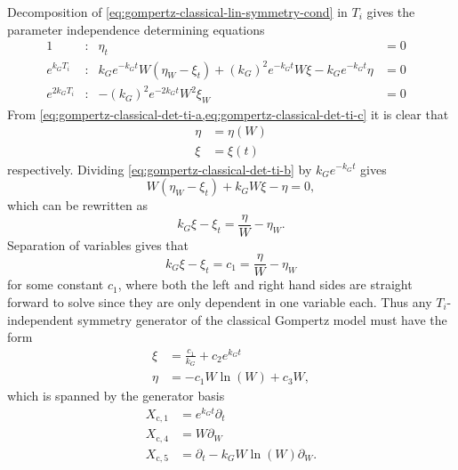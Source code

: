 Decomposition of \cref{eq:gompertz-classical-lin-symmetry-cond} in \(T_i\) gives the parameter independence determining equations
\begin{subequations}
  \begin{flalign}
    1 & : & \eta_t &= 0 &\label{eq:gompertz-classical-det-ti-a}\\
    e^{k_G T_i} & : & k_G e^{-k_G t} W \left(\eta_W - \xi_t\right) + (k_G)^2 e^{-k_G t} W \xi - k_G e^{-k_G t} \eta &= 0 &\label{eq:gompertz-classical-det-ti-b}\\
    e^{2 k_G T_i} & : & -(k_G)^2 e^{-2 k_G t} W^2 \xi_W &= 0 &\label{eq:gompertz-classical-det-ti-c}
  \end{flalign}
\end{subequations}
From \cref{eq:gompertz-classical-det-ti-a,eq:gompertz-classical-det-ti-c} it is clear that
\begin{align*}
  \eta &= \eta(W) \\
  \xi &= \xi(t)
\end{align*}
respectively.
Dividing \cref{eq:gompertz-classical-det-ti-b} by \(k_G e^{-k_G t}\) gives
\begin{equation}\label{eq:gompertz-classical-det-ti-b-simple}
  W \left(\eta_W - \xi_t\right) + k_G W \xi - \eta = 0,
\end{equation}
which can be rewritten as
\begin{equation}
  k_G \xi - \xi_t = \frac{\eta}{W} - \eta_W.
\end{equation}
Separation of variables gives that
\begin{equation}
  k_G \xi - \xi_t = c_1 = \frac{\eta}{W} - \eta_W
\end{equation}
for some constant \(c_1\), where both the left and right hand sides are straight forward to solve since they are only dependent in one variable each.
Thus any \(T_i\)-independent symmetry generator of the classical Gompertz model  must have the form
\begin{align*}
  \xi &= \frac{c_1}{k_G} + c_2 e^{k_G t} \\
  \eta &= -c_1 W \ln\left(W\right) + c_3 W,
\end{align*}
which is spanned by the generator basis
\begin{align*}
  X_{\text{c},1} &= e^{k_G t} \partial_t \\
  X_{\text{c},4} &= W \partial_W \\
  X_{\text{c},5} &= \partial_t - k_G W \ln\left(W\right) \partial_W.
\end{align*}

